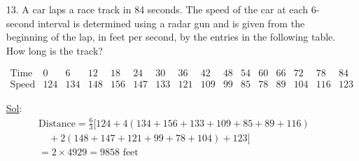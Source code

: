 \begin{enumerate}
\begin{enumerate}
      \item[13.] A car laps a race track in 84 seconds. The speed of
        the car at each 6-second interval is determined using a radar
        gun and is given from the beginning of the lap, in feet per
        second, by the entries in the following table. How long is the track?

        \[
          \begin{array}{l|l|l|l|l|l|l|l|l|l|l|l|l|l|l|l}
            \text{Time} & 0 & 6 & 12 & 18 & 24 & 30 & 36 & 42 & 48 &
            54 & 60 & 66 & 72 & 78 & 84 \\
            \hline
            \text{Speed} & 124 & 134 & 148 & 156 & 147 & 133 & 121 &
            109 & 99 & 85 & 78 & 89 & 104 & 116 & 123
          \end{array}
        \]

        \underline{Sol}:\\
        \[
          \begin{array}{l}
            \displaystyle \text{Distance} = \frac{6}{3} \Biggl[ 124 +
              4(134 + 156 + 133 + 109 + 85 + 89 + 116) \\
              \displaystyle \quad + 2(148 + 147 + 121 + 99 + 78 + 104)
            + 123 \Biggr] \\
            \displaystyle = 2 \times 4929 = \boxed{9858} \text{ feet}
          \end{array}
        \]

    \end{enumerate}
\end{enumerate}
